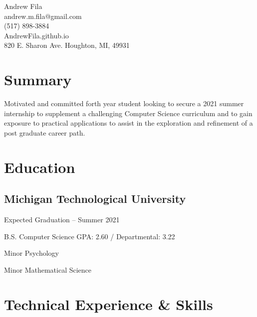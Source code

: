 \documentclass{article}
\begin{document}
\begin{center}
{\huge Andrew Fila}\\
    \faEnvelope \hspace{.05in}andrew.m.fila@gmail.com\\
    \faPhone \hspace{.05in} (517) 898-3884\\
    \faGlobe \hspace{.05in} AndrewFila.github.io\\
    \faMapMarker \hspace{.05in} 820 E. Sharon Ave. Houghton, MI, 49931
\end{center}

\section{Summary}
Motivated and committed forth year student looking to secure a 2021 summer internship to supplement a challenging Computer Science curriculum and to gain exposure to practical applications to assist in the exploration and refinement of a post graduate career path.


\section{Education}
\subsection{Michigan Technological University} \hfill Expected Graduation -- Summer 2021

B.S. Computer Science \hfill GPA: 2.60 / Departmental: 3.22

Minor Psychology

Minor Mathematical Science
%
%

\section{Technical Experience \& Skills}
\end{document}
